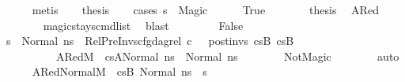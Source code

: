 \begin{isabellebody}
\ \ \ \ \isamarkupfalse%
\ metis\isanewline
\isanewline
\ \ \isamarkupfalse%
\ {\isacharquery}{\kern0pt}thesis\isanewline
\ \ \isamarkupfalse%
\ {\isacharparenleft}{\kern0pt}cases\ {\isachardoublequoteopen}s{\isacharprime}{\kern0pt}{\isacharprime}{\kern0pt}\ {\isacharequal}{\kern0pt}\ Magic{\isachardoublequoteclose}{\isacharparenright}{\kern0pt}\isanewline
\ \ \ \ \isamarkupfalse%
\ True\isanewline
\ \ \ \ \isamarkupfalse%
\ \isamarkupfalse%
\ {\isacharquery}{\kern0pt}thesis\ \isamarkupfalse%
\ A{}Red{}\isanewline
\ \ \ \ \ \ \isamarkupfalse%
\ magic{\isacharunderscore}{\kern0pt}stays{\isacharunderscore}{\kern0pt}cmd{\isacharunderscore}{\kern0pt}list\ \isamarkupfalse%
\ blast\isanewline
\ \ \isamarkupfalse%
\isanewline
\ \ \ \ \isamarkupfalse%
\ False\isanewline
\ \ \ \ \isamarkupfalse%
\ {\isachardoublequoteopen}s{\isacharprime}{\kern0pt}{\isacharprime}{\kern0pt}\ {\isacharequal}{\kern0pt}\ Normal\ ns{}{\isachardoublequoteclose}\ \ RelPreInvs{\isacharcolon}{\kern0pt}{\isachardoublequoteopen}cfg{\isacharunderscore}{\kern0pt}dag{\isacharunderscore}{\kern0pt}rel\ c\ {\isacharbrackleft}{\kern0pt}{\isacharbrackright}{\kern0pt}\ {\isacharbrackleft}{\kern0pt}{\isacharbrackright}{\kern0pt}\ post{\isacharunderscore}{\kern0pt}invs\ cs{}B\ cs{}B{\isacharprime}{\kern0pt}{\isachardoublequoteclose}\ \ \isanewline
\ \ \ \ \ \ \ \ \ \ A{}Red{}{\isacharcolon}{\kern0pt}{\isachardoublequoteopen}M{\isacharcomma}{\kern0pt}{\isasymLambda}{\isacharcomma}{\kern0pt}{\isasymGamma}{\isacharcomma}{\kern0pt}{\isasymOmega}\ {\isasymturnstile}\ {\isasymlangle}cs{}A{\isacharprime}{\kern0pt}{\isacharcomma}{\kern0pt}Normal\ ns{}{\isacharprime}{\kern0pt}{\isasymrangle}\ {\isacharbrackleft}{\kern0pt}{\isasymrightarrow}{\isacharbrackright}{\kern0pt}\ Normal\ ns{}{\isacharprime}{\kern0pt}{\isachardoublequoteclose}\isanewline
\ \ \ \ \ \ \isamarkupfalse%
\ NotMagic{}\isanewline
\ \ \ \ \ \ \isamarkupfalse%
\ auto\isanewline
\ \ \ \ \isamarkupfalse%
\ A{}Red{}Normal{\isacharcolon}{\kern0pt}{\isachardoublequoteopen}{\isacharparenleft}{\kern0pt}M{\isacharcomma}{\kern0pt}{\isasymLambda}{\isacharcomma}{\kern0pt}{\isasymGamma}{\isacharcomma}{\kern0pt}{\isasymOmega}\ {\isasymturnstile}\ {\isasymlangle}cs{}B{\isacharcomma}{\kern0pt}\ Normal\ ns{}{\isasymrangle}\ {\isacharbrackleft}{\kern0pt}{\isasymrightarrow}{\isacharbrackright}{\kern0pt}\ s{\isacharprime}{\kern0pt}{\isacharparenright}{\kern0pt}{\isachardoublequoteclose}\ \isamarkupfalse%

\end{isabellebody}
